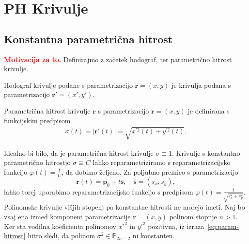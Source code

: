 \documentclass[isrm2, tisk]{fmfdelo}
\newcommand{\R}{\mathbb R}
\newcommand{\p}{\mathbf{p}}
\newcommand{\mycomment}[1]{\textbf{\textcolor{red}{#1}}}
\begin{document}
    \section{PH Krivulje}

    \subsection{Konstantna parametrična hitrost}
    \mycomment{Motivacija za to.}
    Definirajmo z začetek hodograf, ter parametrično hitrost krivulje.
    \begin{definicija}
        Hodograf krivulje podane s parametrizacijo $\mathbf{r}=(x,y)$ je krivulja podana s parametrizacijo $\mathbf{r'}=(x',y')$.
    \end{definicija}
    \begin{definicija}
        Parametrična hitrost krivulje $\mathbf{r}$ s parametrizacijo $\mathbf{r}= \left(x,y\right)$ je definirana s funkcijskim predpisom
        \begin{align}
            \sigma(t)= |\mathbf{r'}(t)| = \sqrt {x^{'2}(t)+y^{'2}(t)}. \label{eq:param-hitrost}
        \end{align}
    \end{definicija}
    \noindent Idealno bi bilo, da je parametrična hitrost krivulje $\sigma \equiv 1$.
    Krivulje s konstantno parametrično hitrostjo $\sigma\equiv C$ lahko reparametriziramo s reparametrizacijsko funkcijo $\varphi(t)=\frac{t}{C}$, da dobimo željeno.
    Za poljubno premico s parametrizacijo
    \[\mathbf{r}(t) = \p_0 + t\mathbf{s},\quad  \mathbf{s} = (s_x,s_y),\]
    lahko torej uporabimo reparametrizacijsko funkcijo s predpisom $\varphi(t) = \frac{t}{\sqrt{s_x^2+s_y^2}}$.
    Polinomske krivulje višjih stopenj pa konstantne hitrosti ne morejo imeti.
    Naj bo vsaj ena izmed komponent parametrizacije $\mathbf{r}=(x,y)$ polinom stopnje $n>1$.
    Ker sta vodilna koeficienta polinomov $x'^2$ in $y'^2$ pozitivna, iz izraza~\eqref{eq:param-hitrost} hitro sledi, da polinom $\sigma^2\in\mathbb{P}_{2n-2}$ ni konstanten.
\end{document}
